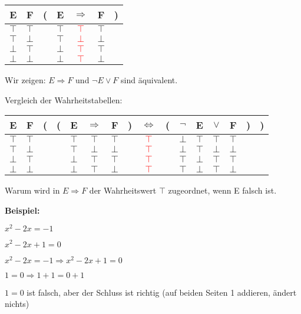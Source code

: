\documentclass[pdftex,12pt,a4paper,fleqn]{scrartcl}
\begin{document}
\begin{tabular}{@{ }c@{ }@{ }c | c@{}@{ }c@{ }@{ }c@{ }@{ }c@{ }@{}c@{ }}
E & F & ( & E & $\Rightarrow$ & F & )\\
\hline 
$\top$ & $\top$ &  & $\top$ & \textcolor{red}{$\top$} & $\top$ & \\
$\top$ & $\bot$ &  & $\top$ & \textcolor{red}{$\bot$} & $\bot$ & \\
$\bot$ & $\top$ &  & $\bot$ & \textcolor{red}{$\top$} & $\top$ & \\
$\bot$ & $\bot$ &  & $\bot$ & \textcolor{red}{$\top$} & $\bot$ & \\
\end{tabular}

Wir zeigen: $E \Rightarrow F$ und $\neg E \lor F$ sind äquivalent.

Vergleich der Wahrheitstabellen:

\begin{tabular}{@{ }c@{ }@{ }c | c@{}@{}c@{}@{ }c@{ }@{ }c@{ }@{ }c@{ }@{}c@{}@{ }c@{ }@{}c@{}@{ }c@{ }@{ }c@{ }@{ }c@{ }@{ }c@{ }@{}c@{}@{}c@{ }}
E & F & ( & ( & E & $\Rightarrow$ & F & ) & $\Leftrightarrow$ & ( & $\neg$ & E & $\lor$ & F & ) & )\\
\hline 
$\top$ & $\top$ &  &  & $\top$ & $\top$ & $\top$ &  & \textcolor{red}{$\top$} &  & $\bot$ & $\top$ & $\top$ & $\top$ &  & \\
$\top$ & $\bot$ &  &  & $\top$ & $\bot$ & $\bot$ &  & \textcolor{red}{$\top$} &  & $\bot$ & $\top$ & $\bot$ & $\bot$ &  & \\
$\bot$ & $\top$ &  &  & $\bot$ & $\top$ & $\top$ &  & \textcolor{red}{$\top$} &  & $\top$ & $\bot$ & $\top$ & $\top$ &  & \\
$\bot$ & $\bot$ &  &  & $\bot$ & $\top$ & $\bot$ &  & \textcolor{red}{$\top$} &  & $\top$ & $\bot$ & $\top$ & $\bot$ &  & \\
\end{tabular}

Warum wird in $E \Rightarrow F$ der Wahrheitswert $\top$ zugeordnet, wenn E falsch ist.

\textbf{Beispiel:}

$x^2-2x=-1$

$x^2-2x+1=0$

$x^2-2x=-1 \Rightarrow x^2-2x+1=0$

$1=0 \Rightarrow 1+1=0+1$

$1=0$ ist falsch, aber der Schluss ist richtig (auf beiden Seiten 1 addieren, ändert nichts)
\end{document}
